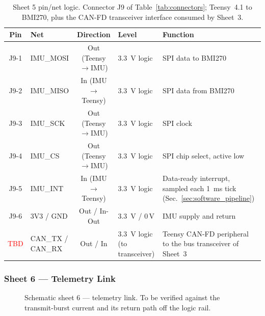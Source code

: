 \begin{table}[htbp]
\centering
\caption[Sheet 5 pin/net logic]{Sheet 5 pin/net logic. Connector J9 of Table~\ref{tab:connectors};
Teensy~4.1 to BMI270, plus the CAN-FD transceiver interface consumed by
Sheet~3.}
\label{tab:pins_fc_imu}
\small
\setlength{\tabcolsep}{4pt}
\begin{tabular}{c L{2.6cm} c L{2.4cm} L{5.4cm}}
\toprule
Pin & Net & Direction & Level & Function \\
\midrule
J9-1 & IMU\_MOSI & Out (Teensy$\to$IMU) & \qty{3.3}{\volt} logic & SPI data to BMI270 \\
J9-2 & IMU\_MISO & In (IMU$\to$Teensy) & \qty{3.3}{\volt} logic & SPI data from BMI270 \\
J9-3 & IMU\_SCK & Out (Teensy$\to$IMU) & \qty{3.3}{\volt} logic & SPI clock \\
J9-4 & IMU\_CS & Out (Teensy$\to$IMU) & \qty{3.3}{\volt} logic & SPI chip select, active low \\
J9-5 & IMU\_INT & In (IMU$\to$Teensy) & \qty{3.3}{\volt} logic & Data-ready interrupt, sampled each \qty{1}{\milli\second} tick (Sec.~\ref{sec:software_pipeline}) \\
J9-6 & 3V3 / GND & Out / In-Out & \qty{3.3}{\volt} / 0\,V & IMU supply and return \\
\textcolor{red}{TBD} & CAN\_TX / CAN\_RX & Out / In & \qty{3.3}{\volt} logic (to transceiver) & Teensy CAN-FD peripheral to the bus transceiver of Sheet~3 \\
\bottomrule
\end{tabular}
\end{table}

\subsubsection{Sheet 6 --- Telemetry Link}
\begin{figure}[htbp]
\centering
{}
\caption[Schematic sheet 6: telemetry link]{Schematic sheet 6 --- telemetry link. To be verified against the
transmit-burst current and its return path off the logic rail.}
\label{fig:sch_telemetry}
\end{figure}

